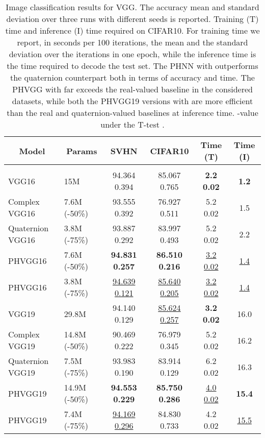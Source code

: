 \documentclass[lettersize,journal]{IEEEtran}
\begin{document}
\begin{table*}[t]
\caption{Image classification results for VGG. The accuracy mean and standard deviation over three runs with different seeds is reported. Training (T) time and inference (I) time required on CIFAR10. For training time we report, in seconds per 100 iterations, the mean and the standard deviation over the iterations in one epoch, while the inference time is the time required to decode the test set. The PHNN with  outperforms the quaternion counterpart both in terms of accuracy and time. The PHVGG with  far exceeds the real-valued baseline in the considered datasets, while both the PHVGG19 versions with  are more efficient than the real and quaternion-valued baselines at inference time. -value under the T-test .}
\label{tab:img_class}
\begin{center}
\begin{tabular}{llcccc}
\multicolumn{1}{c}{\bf Model} &\multicolumn{1}{c}{\bf Params} &\multicolumn{1}{c}{\bf SVHN} &\multicolumn{1}{c}{\bf CIFAR10} &\multicolumn{1}{c}{\bf Time (T)} &\multicolumn{1}{c}{\bf Time (I)}\\
\hline \\
VGG16         & 15M          & 94.364  0.394 & 85.067  0.765 & \textbf{2.2  0.02} & \textbf{1.2}\\
Complex VGG16 & 7.6M (-50\%) & 93.555  0.392 & 76.927  0.511 & 5.2  0.02 & 1.5\\
Quaternion VGG16 & 3.8M (-75\%) & 93.887  0.292 & 83.997  0.493 & 5.2  0.02 & 2.2\\
PHVGG16  & 7.6M (-50\%) & \textbf{94.831  0.257} & \textbf{86.510  0.216} & \underline{3.2  0.02} & \underline{1.4}\\
PHVGG16  & 3.8M (-75\%) & \underline{94.639  0.121}  & \underline{85.640  0.205} &  \underline{3.2  0.02} & \underline{1.4}\\
\hline
VGG19                & 29.8M &   94.140  0.129    &     \underline{85.624  0.257}    &  \textbf{3.2  0.02} & 16.0   \\
Complex VGG19 & 14.8M (-50\%) & 90.469  0.222 & 76.979  0.345 & 5.2  0.02 & 16.2\\
Quaternion VGG19     & 7.5M (-75\%)  &   93.983  0.190   &    83.914  0.129     &   6.2  0.02 & 16.3  \\
PHVGG19       & 14.9M (-50\%) &  \textbf{94.553  0.229}    &    \textbf{85.750  0.286}     &   \underline{4.0  0.02} & \textbf{15.4}  \\
PHVGG19       & 7.4M (-75\%)  &  \underline{94.169  0.296}    &    84.830  0.733     &  4.2  0.02 & \underline{15.5}   \\
\end{tabular}
\end{center}
\end{table*}
\end{document}

